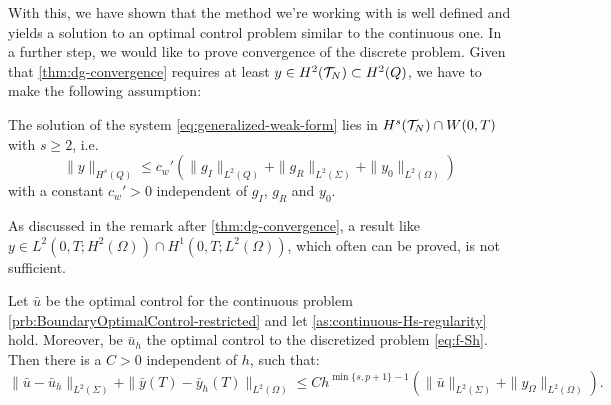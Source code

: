 \documentclass[../thesis.tex]{subfiles}
\begin{document}
With this, we have shown that the method we're working with is well defined and yields a solution to an optimal control problem similar to the continuous one.
In a further step, we would like to prove convergence of the discrete problem.
Given that \cref{thm:dg-convergence} requires at least $y \in H^2(\mathcal{T}_N) \subset H^2(Q)$, we have to make the following assumption:
\begin{assumption}
\label{as:continuous-Hs-regularity}
The solution of the system \cref{eq:generalized-weak-form} lies in $H^s(\mathcal{T}_N) \cap W(0,T)$ with $s \geq 2$, i.e.
\[
	\| y \|_{H^s(Q)} \leq c_w' \left( \| g_I \|_{L^2(Q)} + \| g_R \|_{L^2(\Sigma)} + \| y_0 \|_{L^2(\Omega)} \right)
\]
with a constant $c_w' > 0$ independent of $g_I$, $g_R$ and $y_0$.
\end{assumption}
As discussed in the remark after \cref{thm:dg-convergence}, a result like $y \in L^2(0, T; H^2(\Omega)) \cap H^1(0, T; L^2(\Omega))$, which often can be proved, is not sufficient.
\begin{theorem}
\label{thm:optimal-control-convergence}
Let $\bar{u}$ be the optimal control for the continuous problem \cref{prb:BoundaryOptimalControl-restricted} and let \cref{as:continuous-Hs-regularity} hold. Moreover, be $\bar{u}_h$ the optimal control to the discretized problem \cref{eq:f-Sh}.
Then there is a $C > 0$ independent of $h$, such that:
\[
	\| \bar{u} - \bar{u}_h \|_{L^2(\Sigma)} + \| \bar{y}(T) - \bar{y}_h(T) \|_{L^2(\Omega)} \leq C h^{\min \{ s, p+1\} - 1} \left( \| \bar{u} \|_{L^2(\Sigma)} + \| y_\Omega \|_{L^2(\Omega)} \right).
\]
\end{theorem}
\end{document}
